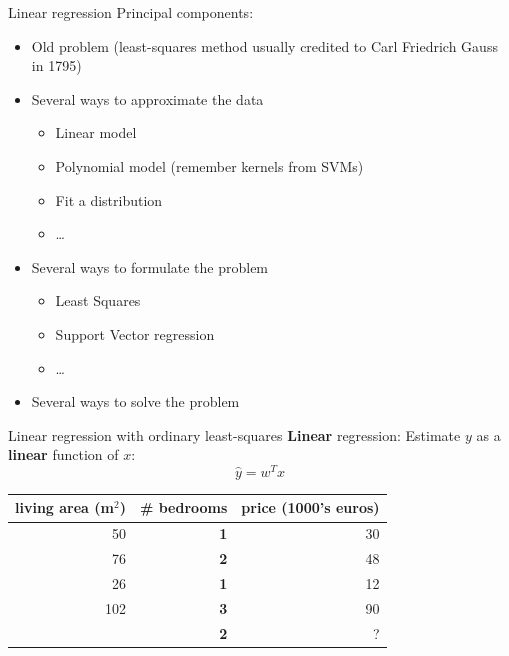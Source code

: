 \documentclass{beamer}
\begin{document}
\begin{frame}{Linear regression}
Principal components:
\begin{itemize}
	\item Old problem (least-squares method usually credited to Carl Friedrich Gauss in 1795)
	\item Several ways to approximate the data
	\begin{itemize}
		\item Linear model
		\item Polynomial model (remember kernels from SVMs)
		\item Fit a distribution
		\item \ldots
	\end{itemize}
	\item Several ways to formulate the problem
	\begin{itemize}
		\item Least Squares
		\item Support Vector regression
		\item \ldots
	\end{itemize}
	\item Several ways to solve the problem
\end{itemize}
\end{frame}

\begin{frame}{Linear regression with ordinary least-squares}
\textbf{Linear} regression: Estimate $y$ as a \textbf{linear} function of $x$:
$$ \hat{y} = w^T x$$
\end{frame}

\begin{frame}

\begin{table}
\centering
\begin{tabular}{r|r|r}
living area (m$^2$) &  \textbf{\# bedrooms} & price (1000's euros) \\\hline
50 & \textbf{1} & 30\\
76 & \textbf{2} & 48\\
26 & \textbf{1} & 12\\
102 & \textbf{3} & 90\\
\pause
61 & \textbf{2} & ?
\end{tabular}
\end{table}

\end{frame}
\end{document}

